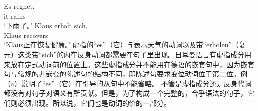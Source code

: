 \eal
\ex\label{Beispiel-es-regnet}
\gll Es regnet.\\
     it rains\\
\glt `下雨了。'
\ex\label{Beispiel-erholt-sich}
\gll Klaus erholt sich.\\
     Klaus recovers \\
\glt `Klaus正在恢复健康。'
\zl
虚指的“es”（它）与表示天气的动词以及带“erholen”（复元）这类带“sich”的内在反身动词都需要在句子里出现。日耳曼语言有虚指成分用来放在定式动词前的位置上。这些虚指成分并不能用在德语的嵌套句中，因为嵌套句与常规的非嵌套的陈述句的结构不同，即陈述句要求变位动词位于第二位。例（a）说明了“es”（它）在引导的从句中不能省略。
\eal
{}
\zl
不管是虚指成分还是反身代词都没有对句子对语义有所贡献。但是，为了构成一个完整的，合乎语法的句子，它们则必须出现。所以说，它们也是动词的价的一部分。

